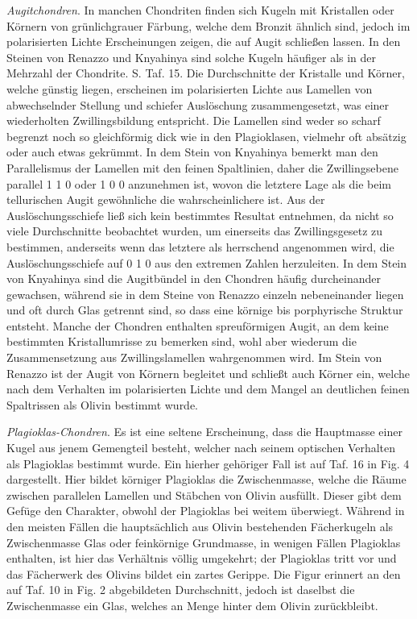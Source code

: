 \documentclass[a4paper, 12pt, oneside]{article}
\begin{document}
\emph{Augitchondren}. In manchen Chondriten finden sich Kugeln mit Kristallen oder Körnern von grünlichgrauer Färbung, welche dem Bronzit ähnlich sind, jedoch im polarisierten Lichte Erscheinungen zeigen, die auf Augit schließen lassen. In den Steinen von Renazzo und Knyahinya sind solche Kugeln häufiger als in der Mehrzahl der Chondrite. S. Taf. 15. Die Durchschnitte der Kristalle und Körner, welche günstig liegen, erscheinen im polarisierten Lichte aus Lamellen von abwechselnder Stellung und schiefer Auslöschung zusammengesetzt, was einer wiederholten Zwillingsbildung entspricht. Die Lamellen sind weder so scharf begrenzt noch so gleichförmig dick wie in den Plagioklasen, vielmehr oft absätzig oder auch etwas gekrümmt. In dem Stein von Knyahinya bemerkt man den Parallelismus der Lamellen mit den feinen Spaltlinien, daher die Zwillingsebene parallel 1 1 0 oder 1 0 0 anzunehmen ist, wovon die letztere Lage als die beim tellurischen Augit gewöhnliche die wahrscheinlichere ist. Aus der Auslöschungsschiefe ließ sich kein bestimmtes Resultat entnehmen, da nicht so viele Durchschnitte beobachtet wurden, um einerseits das Zwillingsgesetz zu bestimmen, anderseits wenn das letztere als herrschend angenommen wird, die Auslöschungsschiefe auf 0 1 0 aus den extremen Zahlen herzuleiten. In dem Stein von Knyahinya sind die Augitbündel in den Chondren häufig durcheinander gewachsen, während sie in dem Steine von Renazzo einzeln nebeneinander liegen und oft durch Glas getrennt sind, so dass eine körnige bis porphyrische Struktur entsteht. Manche der Chondren enthalten spreuförmigen Augit, an dem keine bestimmten Kristallumrisse zu bemerken sind, wohl aber wiederum die Zusammensetzung aus Zwillingslamellen wahrgenommen wird. Im Stein von Renazzo ist der Augit von Körnern begleitet und schließt auch Körner ein, welche nach dem Verhalten im polarisierten Lichte und dem Mangel an deutlichen feinen Spaltrissen als Olivin bestimmt wurde.

\emph{Plagioklas-Chondren}. Es ist eine seltene Erscheinung, dass die Hauptmasse einer Kugel aus jenem Gemengteil besteht, welcher nach seinem optischen Verhalten als Plagioklas bestimmt wurde. Ein hierher gehöriger Fall ist auf Taf. 16 in Fig. 4 dargestellt. Hier bildet körniger Plagioklas die Zwischenmasse, welche die Räume zwischen parallelen Lamellen und Stäbchen von Olivin ausfüllt. Dieser gibt dem Gefüge den Charakter, obwohl der Plagioklas bei weitem überwiegt. Während in den meisten Fällen die hauptsächlich aus Olivin bestehenden Fächerkugeln als Zwischenmasse Glas oder feinkörnige Grundmasse, in wenigen Fällen Plagioklas enthalten, ist hier das Verhältnis völlig umgekehrt; der Plagioklas tritt vor und das Fächerwerk des Olivins bildet ein zartes Gerippe. Die Figur erinnert an den auf Taf. 10 in Fig. 2 abgebildeten Durchschnitt, jedoch ist daselbst die Zwischenmasse ein Glas, welches an Menge hinter dem Olivin zurückbleibt.
\end{document}
